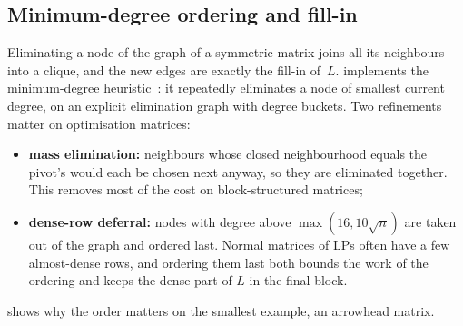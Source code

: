 \subsection{Minimum-degree ordering and fill-in}\label{sec:ordering}
Eliminating a node of the graph of a symmetric matrix joins all its neighbours into a clique, and
the new edges are exactly the fill-in of~$L$.  implements the minimum-degree
heuristic~\cite{tinney1967,george1989}: it repeatedly eliminates a node of smallest current degree,
on an explicit elimination graph with degree buckets. Two refinements matter on optimisation
matrices:
\begin{itemize}
  \item \textbf{mass elimination:} neighbours whose closed neighbourhood equals the pivot's would each
        be chosen next anyway, so they are eliminated together. This removes most of the cost on
        block-structured matrices;
  \item \textbf{dense-row deferral:} nodes with degree above $\max(16,10\sqrt n)$ are taken out of the
        graph and ordered last. Normal matrices of LPs often have a few almost-dense rows, and
        ordering them last both bounds the work of the ordering and keeps the dense part of $L$ in
        the final block.
\end{itemize}
 shows why the order matters on the smallest example, an arrowhead matrix.

